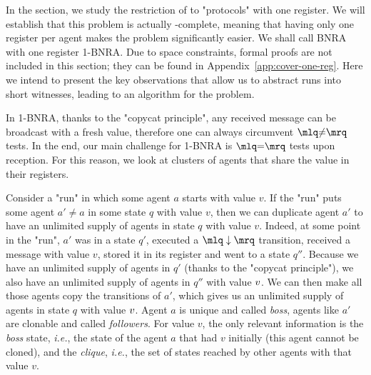 In the section, we study the restriction of \COVER to "protocols" with one register. We will establish that this problem is actually \NP-complete, meaning that having only one register per agent makes the problem significantly easier. 
	We shall call BNRA with one register 1-BNRA. Due to space constraints, formal proofs are not included in this section; they can be found in Appendix~\ref{app:cover-one-reg}. Here we intend to present the key observations that allow us to abstract runs into short witnesses, leading to an \NP algorithm for the problem.
	
	In 1-BNRA, thanks to the "copycat principle", any received message can be broadcast with a fresh value, therefore one can always circumvent $\quotemarks{\diseqtestact}$ tests. In the end, our main challenge for 1-BNRA is $\quotemarks{\eqtestact}$ tests upon reception.
	For this reason, we look at clusters of agents that share the value in their registers. 

	Consider a "run" in which some agent $a$ starts with value $v$. 
	If the "run" puts some agent $a' \ne a$ in some state $q$ with value $v$, then we can duplicate agent $a'$ to have an unlimited supply of agents in state $q$ with value $v$. 
	Indeed, at some point in the "run", $a'$ was in a state $q'$, executed a $\quotemarks{\enregact}$ transition, received a message with value $v$, stored it in its register and went to a state $q''$. 
	Because we have an unlimited supply of agents in $q'$ (thanks to the "copycat principle"), we also have an unlimited supply of agents in $q''$ with value $v$. 
	We can then make all those agents copy the transitions of $a'$, which gives us an unlimited supply of agents in state $q$ with value $v$. Agent $a$ is unique and called \emph{boss}, agents like $a'$ are clonable and called \emph{followers}. For value $v$, the only relevant information is the \emph{boss} state, \emph{i.e.}, the state of the agent $a$ that had $v$ initially (this agent cannot be cloned), and the \emph{clique}, \emph{i.e.}, the set of states reached by other agents with that value $v$. 

